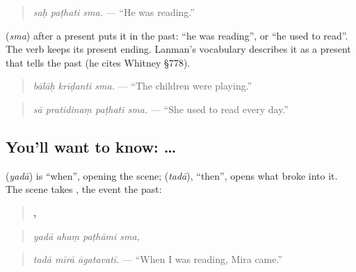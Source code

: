 \begin{quote}
\emph{saḥ paṭhati sma.} — \textquotedblleft{}He was reading.\textquotedblright{}
\end{quote}

\textbf{} (\emph{sma}) after a present puts it in the past: \textquotedblleft{}he was reading\textquotedblright{}, or \textquotedblleft{}he used to read\textquotedblright{}. The verb keeps its present ending. Lanman's vocabulary describes it as a present that tells the past (he cites Whitney §778).

\begin{quote}
\textbf{  }
\end{quote}

\begin{quote}
\emph{bālāḥ krīḍanti sma.} — \textquotedblleft{}The children were playing.\textquotedblright{}
\end{quote}

\begin{quote}
\textbf{   }
\end{quote}

\begin{quote}
\emph{sā pratidinaṃ paṭhati sma.} — \textquotedblleft{}She used to read every day.\textquotedblright{}
\end{quote}

\subsection*{You'll want to know:  … }
\textbf{} (\emph{yadā}) is \textquotedblleft{}when\textquotedblright{}, opening the scene; \textbf{} (\emph{tadā}), \textquotedblleft{}then\textquotedblright{}, opens what broke into it. The scene takes \textbf{}, the event the past:

\begin{quote}
\textbf{   ,}
\end{quote}

\begin{quote}
\emph{yadā ahaṃ paṭhāmi sma,}
\end{quote}

\begin{quote}
\textbf{  }
\end{quote}

\begin{quote}
\emph{tadā mīrā āgatavatī.} — \textquotedblleft{}When I was reading, Mira came.\textquotedblright{}
\end{quote}

